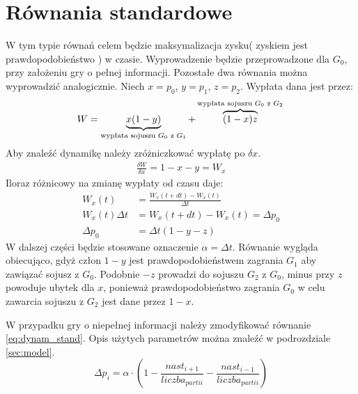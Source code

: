 \section{Równania standardowe}
\label{sec:r_stand}
W tym typie równań celem będzie maksymalizacja zysku( zyskiem jest prawdopodobieństwo ) w czasie. Wyprowadzenie będzie przeprowadzone dla $G_0$, przy założeniu gry o pełnej informacji. Pozostałe dwa równania można wyprowadzić analogicznie. Niech $x=p_0$, $y=p_1$, $z=p_2$. Wypłata dana jest przez:
\begin{equation}\label{eq:wypl_stand}
W = \underbrace{x(1-y)}_{\text{wypłata sojuszu $G_0$ z $G_1$}} + \overbrace{(1-x)z}^{\text{wypłata sojuszu $G_0$ z $G_2$}} \\
\end{equation}
Aby znaleźć dynamikę należy zróżniczkować wypłatę po $\delta x$.
\begin{align*}
\frac{\delta W}{\delta x} = 1-x-y = W_x
\end{align*}
Iloraz różnicowy na zmianę wypłaty od czasu daje:
\begin{align}\label{eq:dynam_stand}
W_x(t) &= \frac{W_x(t+dt)-W_x(t)}{\Delta t} \nonumber\\
W_x(t) \Delta t &= W_x(t+dt)-W_x(t) = \Delta p_0 \nonumber\\
\Delta p_0 &= \Delta t (1-y-z)
\end{align}
W dalszej części będzie stosowane oznaczenie $\alpha = \Delta t$. Równanie wygląda obiecująco, gdyż człon $1 - y$ jest prawdopodobieństwem zagrania $G_1$ aby zawiązać sojusz z $G_0$. Podobnie $-z$ prowadzi do sojuszu $G_2$ z $G_0$, minus przy $z$ powoduje ubytek dla $x$, ponieważ prawdopodobieństwo zagrania $G_0$ w celu zawarcia sojuszu z $G_2$ jest dane przez $1-x$.

W przypadku gry o niepełnej informacji należy zmodyfikować równanie \ref{eq:dynam_stand}. Opis użytych parametrów można znaleźć w podrozdziale \ref{sec:model}.
\begin{equation} \label{eq:stand}
\Delta p_i = \alpha \cdot (1 - \frac{nast_{i+1}}{liczba_{partii}} - \frac{nast_{i-1}}{liczba_{partii}})
\end{equation}


